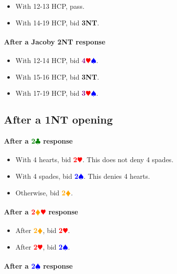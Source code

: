 \documentclass{article}
\newcommand{\Hs}{\textcolor{Red}{$\varheart$}}
\newcommand{\Ss}{\textcolor{Blue}{$\spadesuit$}}
\newcommand{\Ds}{\textcolor{Orange}{$\vardiamond$}}
\newcommand{\Cs}{\textcolor{Green}{$\clubsuit$}}
\newcommand{\NTs}{\textbf{\footnotesize{NT}}}
\renewcommand{\H}[1]{\textcolor{Red}{\textbf{#1}\Hs}}
\renewcommand{\S}[1]{\textcolor{Blue}{\textbf{#1}\Ss}}
\newcommand{\D}[1]{\textcolor{Orange}{\textbf{#1}\Ds}}
\newcommand{\C}[1]{\textcolor{Green}{\textbf{#1}\Cs}}
\newcommand{\NT}[1]{\textbf{#1\NTs}}
\newcommand{\majors}[1]{\textcolor{Purple}{\textbf{#1}}\Hs\Ss}
\newcommand{\reds}[1]{\textcolor{Red}{\textbf{#1}}\Ds\Hs}
\begin{document}
\begin{itemize}
\item With 12-13 HCP, pass.
\item With 14-19 HCP, bid \NT{3}.
\end{itemize}

\paragraph{After a Jacoby \NT{2} response}

\begin{itemize}
\item With 12-14 HCP, bid \majors{4}.
\item With 15-16 HCP, bid \NT{3}.
\item With 17-19 HCP, bid \majors{3}.
\end{itemize}



\subsection{After a \NT{1} opening}

\paragraph{After a \C{2} response}

\begin{itemize}
\item With 4 hearts, bid \H{2}. This does not deny 4 spades.
\item With 4 spades, bid \S{2}. This denies 4 hearts.
\item Otherwise, bid \D{2}.
\end{itemize}

\paragraph{After a \reds{2}  response}

\begin{itemize}
\item After \D{2}, bid \H{2}.
\item After \H{2}, bid \S{2}.
\end{itemize}

\paragraph{After a \S{2} response}
\end{document}
